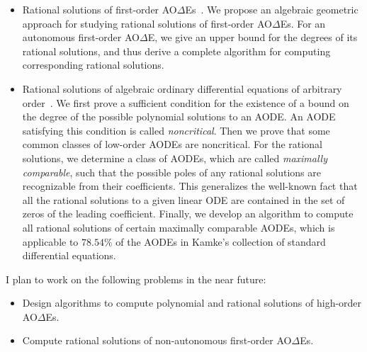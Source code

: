 \documentclass[10pt,a4paper]{article}
\newcommand{\AODE}{{AO{$\Delta$}E}}
\newcommand{\AODEs}{{AO{$\Delta$}Es}}
\begin{document}
\begin{itemize}
\item Rational solutions of first-order \AODEs~\cite{VZ2019}. We propose an algebraic geometric approach for studying rational solutions of first-order \AODEs. 
For an autonomous first-order \AODE, we give an upper bound for the degrees of its rational solutions, and thus derive a complete algorithm for 
computing corresponding rational solutions.

\item  Rational solutions of  algebraic ordinary differential equations of arbitrary order~\cite{VoZhang2019}. 
We first prove a sufficient condition for the existence of a bound on the degree of the possible polynomial solutions to an AODE.
An AODE satisfying this condition is called \emph{noncritical}. 
Then we prove that some common classes of low-order AODEs are noncritical.
For the rational solutions, we determine a class of AODEs, which are called \emph{maximally comparable}, 
such that the possible poles of any rational solutions are recognizable from their coefficients. 
This generalizes the well-known fact that all the rational solutions to a given linear ODE are contained in the set of zeros of the leading coefficient.
Finally, we develop an algorithm to compute all rational solutions of certain maximally comparable AODEs, 
which is applicable to $78.54\%$ of the AODEs in Kamke's collection of standard differential equations.
\end{itemize}

I plan to work on the following problems in the near future:

\begin{itemize}
\item  Design algorithms to compute polynomial and rational solutions of high-order \AODEs.
\item Compute rational solutions of non-autonomous first-order \AODEs. 
\end{itemize}	
\end{document}

